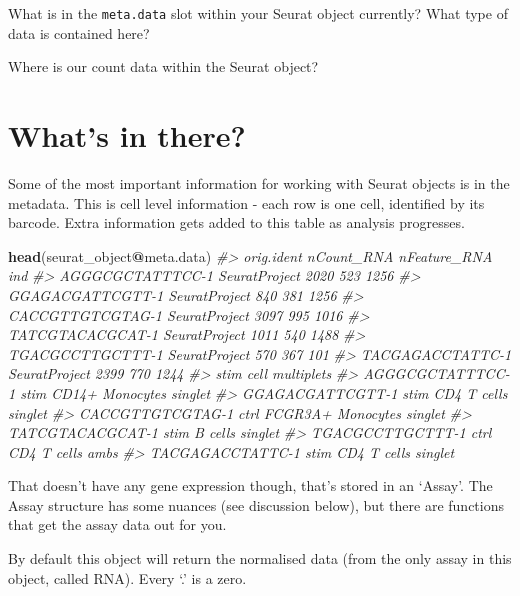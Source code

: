 \documentclass[
]{book}
\newenvironment{Shaded}{\begin{snugshade}}{\end{snugshade}}
\newcommand{\CommentTok}[1]{\textcolor[rgb]{0.56,0.35,0.01}{\textit{#1}}}
\newcommand{\FunctionTok}[1]{\textcolor[rgb]{0.13,0.29,0.53}{\textbf{#1}}}
\newcommand{\NormalTok}[1]{#1}
\newcommand{\SpecialCharTok}[1]{\textcolor[rgb]{0.81,0.36,0.00}{\textbf{#1}}}
\begin{document}
What is in the \texttt{meta.data} slot within your Seurat object currently? What type of data is contained here?

Where is our count data within the Seurat object?

\section{What's in there?}\label{whats-in-there}

Some of the most important information for working with Seurat objects is in the metadata.
This is cell level information - each row is one cell, identified by its barcode.
Extra information gets added to this table as analysis progresses.

\begin{Shaded}
\begin{Highlighting}[]
\FunctionTok{head}\NormalTok{(seurat\_object}\SpecialCharTok{@}\NormalTok{meta.data)}
\CommentTok{\#\textgreater{}                     orig.ident nCount\_RNA nFeature\_RNA  ind}
\CommentTok{\#\textgreater{} AGGGCGCTATTTCC{-}1 SeuratProject       2020          523 1256}
\CommentTok{\#\textgreater{} GGAGACGATTCGTT{-}1 SeuratProject        840          381 1256}
\CommentTok{\#\textgreater{} CACCGTTGTCGTAG{-}1 SeuratProject       3097          995 1016}
\CommentTok{\#\textgreater{} TATCGTACACGCAT{-}1 SeuratProject       1011          540 1488}
\CommentTok{\#\textgreater{} TGACGCCTTGCTTT{-}1 SeuratProject        570          367  101}
\CommentTok{\#\textgreater{} TACGAGACCTATTC{-}1 SeuratProject       2399          770 1244}
\CommentTok{\#\textgreater{}                  stim              cell multiplets}
\CommentTok{\#\textgreater{} AGGGCGCTATTTCC{-}1 stim   CD14+ Monocytes    singlet}
\CommentTok{\#\textgreater{} GGAGACGATTCGTT{-}1 stim       CD4 T cells    singlet}
\CommentTok{\#\textgreater{} CACCGTTGTCGTAG{-}1 ctrl FCGR3A+ Monocytes    singlet}
\CommentTok{\#\textgreater{} TATCGTACACGCAT{-}1 stim           B cells    singlet}
\CommentTok{\#\textgreater{} TGACGCCTTGCTTT{-}1 ctrl       CD4 T cells       ambs}
\CommentTok{\#\textgreater{} TACGAGACCTATTC{-}1 stim       CD4 T cells    singlet}
\end{Highlighting}
\end{Shaded}

That doesn't have any gene expression though, that's stored in an `Assay'.
The Assay structure has some nuances (see discussion below), but there are functions that get the assay data out for you.

By default this object will return the normalised data (from the only assay in this object, called RNA). Every `.' is a zero.
\end{document}
